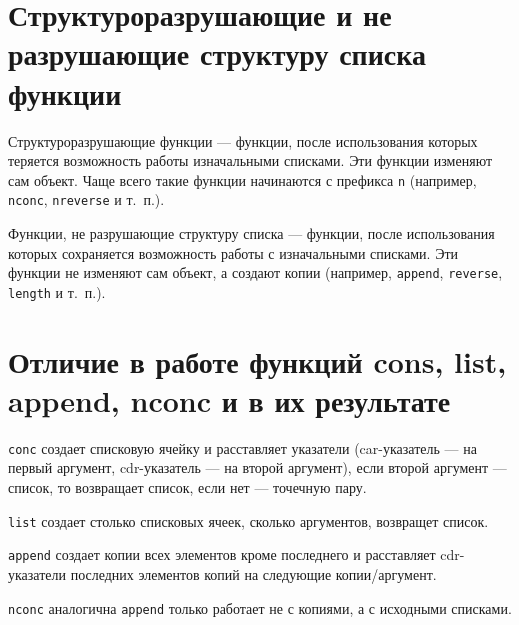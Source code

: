\section{Структуроразрушающие и не разрушающие структуру списка
функции}

Структуроразрушающие функции --- функции, после использования которых
теряется возможность работы изначальными списками. Эти функции изменяют сам
объект. Чаще всего такие функции начинаются с префикса \texttt{n} (например,
\texttt{nconc}, \texttt{nreverse} и т.~п.).

Функции, не разрушающие структуру списка --- функции, после использования
которых сохраняется возможность работы с изначальными списками. Эти функции
не изменяют сам объект, а создают копии (например, \texttt{append},
\texttt{reverse}, \texttt{length} и т.~п.).

\section{Отличие в работе функций cons, list, append, nconc и в их результате}

\texttt{conc} создает списковую ячейку и расставляет указатели (car-указатель
--- на первый аргумент, cdr-указатель --- на второй аргумент), если второй
аргумент --- список, то возвращает список, если нет --- точечную пару.

\texttt{list} создает столько списковых ячеек, сколько аргументов, возвращет
список.

\texttt{append} создает копии всех элементов кроме последнего и расставляет
cdr-указатели последних элементов копий на следующие копии/аргумент.

\texttt{nconc} аналогична \texttt{append} только работает не с копиями, а с
исходными списками.
